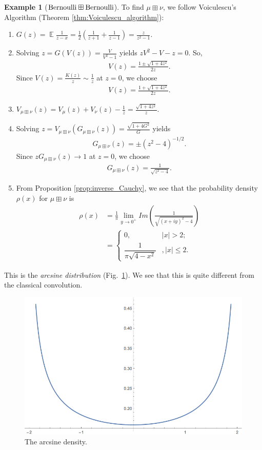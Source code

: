 \documentclass[letterpaper,11pt,oneside,reqno]{amsart}
\numberwithin{equation}{section}
\DeclareMathOperator{\EE}{\mathbb{E}}
\theoremstyle{definition}
\newtheorem{example}[proposition]{Example}
\begin{document}
\begin{example}[$\textnormal{Bernoulli}\boxplus \textnormal{Bernoulli}$]
To find $\mu\boxplus\nu$, we follow Voiculescu's Algorithm (Theorem \ref{thm:Voiculescu_algorithm}):
\begin{enumerate}
    \item $\displaystyle G(z)=\EE\frac{1}{z-x}=\frac{1}{2}\left(\frac{1}{z+1}+\frac{1}{z-1}\right)=\frac{z}{z^2-1}$.
    \item Solving $\displaystyle z=G(V(z))=\frac{V}{V^2-1}$ yields $zV^2-V-z=0$. So, 
    \begin{align*}
        V(z)=\frac{1\pm\sqrt{1+4z^2}}{2z}.
    \end{align*}
    Since $V(z)=\frac{K(z)}{z}\sim \frac{1}{z}$ at $z=0$, we choose
    \begin{align*}
        V(z)=\frac{1+\sqrt{1+4z^2}}{2z}.
    \end{align*}
    \item $\displaystyle V_{\mu\boxplus\nu}(z)=V_{\mu}(z)+V_{\nu}(z)-\frac{1}{z}=\frac{\sqrt{1+4z^2}}{z}$.
    \item Solving $\displaystyle z=V_{\mu\boxplus\nu}(G_{\mu\boxplus\nu}(z))=\frac{\sqrt{1+4G^2}}{G}$ yields 
    \begin{align*}
        G_{\mu\boxplus\nu}(z)=\pm (z^2-4)^{-1/2}.
    \end{align*}
    Since $zG_{\mu\boxplus\nu}(z)\to 1$ at $z=0$, we choose
    \begin{align*}
        G_{\mu\boxplus\nu}(z)=\frac{1}{\sqrt{z^2-4}}.
    \end{align*}
    \item From Proposition \ref{prop:inverse_Cauchy}, we see that the probability density $\rho(x)$ for $\mu\boxplus\nu$ is 
    \begin{align*}
        \rho(x)&=\frac1\pi\lim_{y\to 0^+}Im\left(\frac{1}{\sqrt{(x+iy)^2-4}}\right)\\
        &=
        \begin{cases}
        	0,&|x|>2;\\
        	\dfrac{1}{\pi\sqrt{4-x^2}} &, |x|\leq 2.
        \end{cases}
    \end{align*}
\end{enumerate}
This is the \emph{arcsine distribution} (Fig.~\ref{fig:arcsine}). We see that this is quite different from the classical convolution. 
\end{example}
\begin{figure}[htbp]
	\includegraphics[width=.6\textwidth]{img/arcsine.png}
	\caption{The arcsine density.}
	\label{fig:arcsine}
\end{figure}
\end{document}
